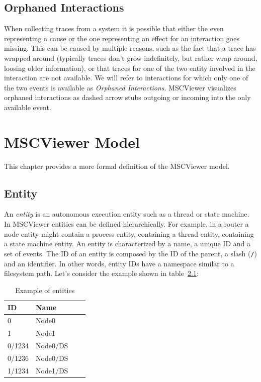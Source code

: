 \documentclass[11pt, twoside, titlepage]{book}
\newcommand{\prog}{MSCViewer}
\newcommand{\defterm}[1]{\textit{#1}\index{#1}}
\begin{document}
\section{Orphaned Interactions}
When collecting traces from a system it is possible that either the even
representing a cause or the one representing an effect for an interaction goes
missing. This can be caused by multiple reasons, such as the fact that a trace
has wrapped around (typically traces don't grow indefinitely, but rather wrap
around, loosing older information), or that traces for one of the two entity
involved in the interaction are not available. We will refer to interactions for
which only one of the two events is available as \defterm{Orphaned
Interactions}.
\prog{} visualizes orphaned interactions as dashed arrow stubs outgoing or
incoming into the only available event.


\chapter{\prog{} Model}
This chapter provides a more formal definition of the \prog{} model. 

\section {Entity}
An \defterm{entity} is an autonomous execution entity such as a thread or state
machine. In MSCViewer entities can be defined hierarchically. For example, in a
router a node entity might contain a process entity, containing  a thread
entity, containing a state machine entity. An entity is characterized by a name,
a unique ID and a set of events. The ID of an entity is composed by the ID of
the parent, a slash (\texttt{/}) and an identifier. In other words, entity IDs
have a namespace similar to a filesystem path.
Let's consider the example shown in table~\ref{tab:entities}:
 
\begin{center}
    \begin{table}[h]
    \centering
    \label{tab:entities}
    \begin{tabular}{ | l | l | l | l |}
    \hline
    ID & Name\\ 
    \hline
    0       & Node0 \\  
    1       & Node1 \\  
    0/1234  & Node0/DS \\
    0/1236  & Node0/DS \\
    1/1234  & Node1/DS \\
    \hline
    \end{tabular}
    \caption{Example of entities}
    \end{table}
\end{center}
\end{document}
